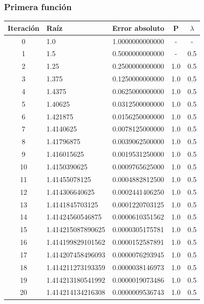 \documentclass[titlepage,a4paper]{article}
\begin{document}
\subsubsection{Primera función}\label{sec:bis1}
\begin{center}
    \begin{tabular}{| c | l | c | c | c |}
    \hline
            Iteración & Raíz & Error absoluto & P & $\lambda$ \\ \hline
    0      & 1.0  &  1.0000000000000  &  -  &  - \\
    1      & 1.5  &  0.5000000000000  &  -  &  0.5 \\
    2      & 1.25  &  0.2500000000000  &  1.0  &  0.5 \\
    3      & 1.375  &  0.1250000000000  &  1.0  &  0.5 \\
    4      & 1.4375  &  0.0625000000000  &  1.0  &  0.5 \\
    5      & 1.40625  &  0.0312500000000  &  1.0  &  0.5 \\
    6      & 1.421875  &  0.0156250000000  &  1.0  &  0.5 \\
    7      & 1.4140625  &  0.0078125000000  &  1.0  &  0.5 \\
    8      & 1.41796875  &  0.0039062500000  &  1.0  &  0.5 \\
    9      & 1.416015625  &  0.0019531250000  &  1.0  &  0.5 \\
    10      & 1.4150390625  &  0.0009765625000  &  1.0  &  0.5 \\
    11      & 1.41455078125  &  0.0004882812500  &  1.0  &  0.5 \\
    12      & 1.414306640625  &  0.0002441406250  &  1.0  &  0.5 \\
    13      & 1.4141845703125  &  0.0001220703125  &  1.0  &  0.5 \\
    14      & 1.41424560546875  &  0.0000610351562  &  1.0  &  0.5 \\
    15      & 1.414215087890625  &  0.0000305175781  &  1.0  &  0.5 \\
    16      & 1.414199829101562  &  0.0000152587891  &  1.0  &  0.5 \\
    17      & 1.414207458496093  &  0.0000076293945  &  1.0  &  0.5 \\
    18      & 1.414211273193359  &  0.0000038146973  &  1.0  &  0.5 \\
    19      & 1.414213180541992  &  0.0000019073486  &  1.0  &  0.5 \\
    20      & 1.414214134216308  &  0.0000009536743  &  1.0  &  0.5 \\

\end{tabular}
\end{center}
\end{document}
